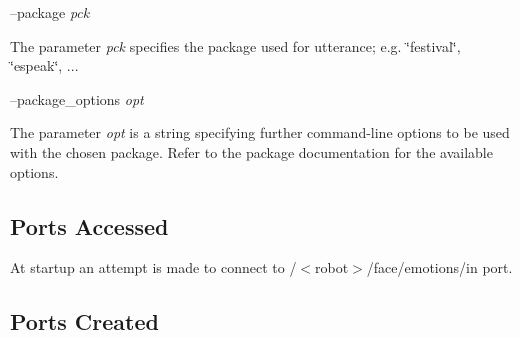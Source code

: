 --package {\itshape pck} 
\begin{DoxyItemize}
\item The parameter {\itshape pck} specifies the package used for utterance; e.\+g. \char`\"{}festival\char`\"{}, \char`\"{}espeak\char`\"{}, ...
\end{DoxyItemize}

--package\+\_\+options {\itshape opt} 
\begin{DoxyItemize}
\item The parameter {\itshape opt} is a string specifying further command-\/line options to be used with the chosen package. Refer to the package documentation for the available options.
\end{DoxyItemize}\hypertarget{group__windows-tts_portsa_sec}{}\subsection{Ports Accessed}\label{group__windows-tts_portsa_sec}
At startup an attempt is made to connect to /$<$robot$>$/face/emotions/in port.\hypertarget{group__windows-tts_portsc_sec}{}\subsection{Ports Created}\label{group__windows-tts_portsc_sec}

